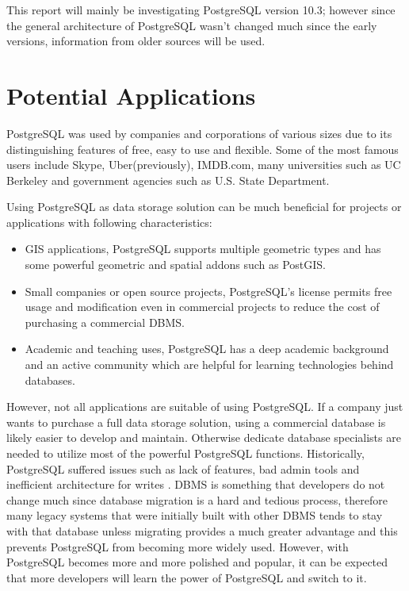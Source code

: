 \documentclass[a4paper]{article}
\begin{document}
This report will mainly be investigating PostgreSQL version 10.3; however since the general architecture of PostgreSQL wasn't changed much since the early versions, information from older sources will be used.
 	

\section{Potential Applications}

PostgreSQL was used by companies and corporations of various sizes due to its distinguishing features of free, easy to use and flexible. Some of the most famous users include Skype, Uber(previously), IMDB.com, many universities such as UC Berkeley and government agencies such as U.S. State Department\cite{8}. 

Using PostgreSQL as data storage solution can be much beneficial for projects or applications with following characteristics:
\begin{itemize}
  \item GIS applications, PostgreSQL supports multiple geometric types and has some powerful geometric and spatial addons such as PostGIS\cite{9}. 
  \item Small companies or open source projects, PostgreSQL's license permits free usage and modification even in commercial projects to reduce the cost of purchasing a commercial DBMS.
  \item Academic and teaching uses, PostgreSQL has a deep academic background and an active community which are helpful for learning technologies behind databases\cite{12}.
  
\end{itemize}

However, not all applications are suitable of using PostgreSQL. If a company just wants to purchase a full data storage solution, using a commercial database is likely easier to develop and maintain. Otherwise dedicate database specialists are needed to utilize most of the powerful PostgreSQL functions.  
Historically, PostgreSQL suffered issues such as lack of features, bad admin tools and inefficient architecture for writes\cite{12} \cite{13}. DBMS is something that developers do not change much since database migration is a hard and tedious process, therefore many legacy systems that were initially built with other DBMS tends to stay with that database unless migrating provides a much greater advantage and this prevents PostgreSQL from becoming more widely used. However, with PostgreSQL becomes more and more polished and popular, it can be expected that more developers will learn the power of PostgreSQL and switch to it.
\end{document}
